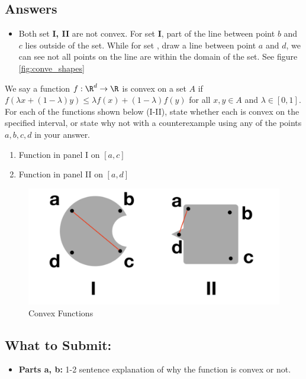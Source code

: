 \documentclass{article}
\begin{document}
\begin{sloppypar}
\begin{aprob}
    \subsection*{Answers}
    \begin{itemize}
        \item Both set \textbf{I, II} are not convex.
        For set \textbf{I}, part of the line between point $b$ and $c$ lies outside of the set.
        While for set , draw a line between point $a$ and $d$, we can see not all points on the line are within the domain of the set.
        See figure \ref{fig:conve_shapes}
    \end{itemize}
\end{aprob}

\begin{aprob}
     We say a function $f: \R^d \rightarrow \R$ is convex on a set $A$ if $f(\lambda x + (1-\lambda) y) \leq \lambda f(x) + (1-\lambda) f(y)$ for all $x,y\in A$ and $\lambda \in [0,1]$. For each of the functions shown below (I-II), state whether each is convex on the specified interval, or state why not with a counterexample using any of the points $a,b,c,d$ in your answer.

    \begin{enumerate}
        \item Function in panel I on $[a,c]$
        \item Function in panel II on $[a,d]$
    \end{enumerate}
    
    \begin{figure}[!h]
        \centering
        \includegraphics[width=.75\textwidth]{./img/convex_functions2.png}
        \caption{Convex Functions}
        \label{fig:convex_functions}
    \end{figure}

    \subsection*{What to Submit:}
    \begin{itemize}
        \item \textbf{Parts a, b:} 1-2 sentence explanation of why the function is convex or not.
    \end{itemize}

\end{aprob}
\end{sloppypar}
\end{document}
